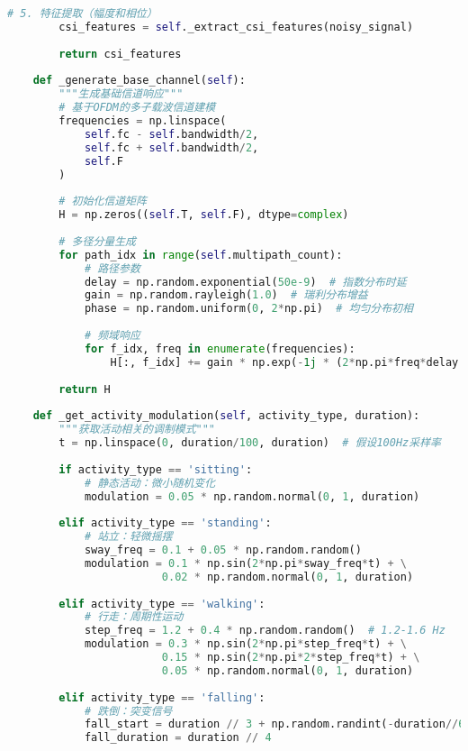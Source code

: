 \begin{lstlisting}[language=Python,caption=合成数据生成器核心实现]
        # 5. 特征提取（幅度和相位）
        csi_features = self._extract_csi_features(noisy_signal)
        
        return csi_features
    
    def _generate_base_channel(self):
        """生成基础信道响应"""
        # 基于OFDM的多子载波信道建模
        frequencies = np.linspace(
            self.fc - self.bandwidth/2,
            self.fc + self.bandwidth/2,
            self.F
        )
        
        # 初始化信道矩阵
        H = np.zeros((self.T, self.F), dtype=complex)
        
        # 多径分量生成
        for path_idx in range(self.multipath_count):
            # 路径参数
            delay = np.random.exponential(50e-9)  # 指数分布时延
            gain = np.random.rayleigh(1.0)  # 瑞利分布增益
            phase = np.random.uniform(0, 2*np.pi)  # 均匀分布初相
            
            # 频域响应
            for f_idx, freq in enumerate(frequencies):
                H[:, f_idx] += gain * np.exp(-1j * (2*np.pi*freq*delay + phase))
        
        return H
    
    def _get_activity_modulation(self, activity_type, duration):
        """获取活动相关的调制模式"""
        t = np.linspace(0, duration/100, duration)  # 假设100Hz采样率
        
        if activity_type == 'sitting':
            # 静态活动：微小随机变化
            modulation = 0.05 * np.random.normal(0, 1, duration)
            
        elif activity_type == 'standing':
            # 站立：轻微摇摆
            sway_freq = 0.1 + 0.05 * np.random.random()
            modulation = 0.1 * np.sin(2*np.pi*sway_freq*t) + \
                        0.02 * np.random.normal(0, 1, duration)
            
        elif activity_type == 'walking':
            # 行走：周期性运动
            step_freq = 1.2 + 0.4 * np.random.random()  # 1.2-1.6 Hz
            modulation = 0.3 * np.sin(2*np.pi*step_freq*t) + \
                        0.15 * np.sin(2*np.pi*2*step_freq*t) + \
                        0.05 * np.random.normal(0, 1, duration)
            
        elif activity_type == 'falling':
            # 跌倒：突变信号
            fall_start = duration // 3 + np.random.randint(-duration//6, duration//6)
            fall_duration = duration // 4
            

\end{lstlisting}
